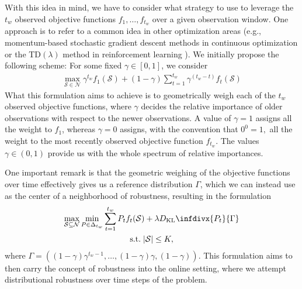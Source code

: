 \documentclass[letter,11pt]{article}
\newcommand{\infdiv}{D_{\text{KL}}\infdivx}
\def\sS{\mathcal{S}}
\def\sN{\mathcal{N}}
\begin{document}
With this idea in mind, we have to consider what strategy to use to leverage the $t_w$ observed objective functions $f_1, \ldots,f_{t_w}$ over a given observation window. One approach is to refer to a common idea in other optimization areas (e.g., momentum-based stochastic gradient descent methods in continuous optimization \cite{kingma2014adam,das2022faster} or the TD$(\lambda)$ method in reinforcement learning \cite{sutton2018reinforcement}). We initially propose the following scheme: For some fixed $\gamma \in [0, 1]$, we consider
\begin{equation}
\begin{split}
\max_{\sS \in \sN} \gamma^{t_w} f_1(\sS) + (1-\gamma) \sum_{t=1}^{t_w} \gamma^{(t_w-t)} f_t(\sS) 
\end{split}
\end{equation}
What this formulation aims to achieve is to geometrically weigh each of the $t_w$ observed objective functions, where $\gamma$ decides the relative importance of older observations with respect to the newer observations. A value of $\gamma = 1$ assigns all the weight to $f_1$, whereas $\gamma=0$ assigns, with the convention that $0^0 = 1,$ all the weight to the most recently observed objective function $f_{t_w}.$ The values $\gamma \in (0, 1)$ provide us with the whole spectrum of relative importances.

One important remark is that the geometric weighing of the objective functions over time effectively gives us a reference distribution $\Gamma$, which we can instead use as the center of a neighborhood of robustness, resulting in the formulation
\begin{equation}\label{eq:tr}
\begin{gathered}
\max_{\sS\subseteq \sN} \min_{P \in \Delta_{t_w}} \sum_{t=1}^{t_w} P_t f_t(\sS) + \lambda \infdiv{P_t}{\Gamma} \\
\text{s.t.}\;\lvert \sS \rvert \leq K, 
\end{gathered}
\end{equation}
where $\Gamma = ((1-\gamma)\gamma^{t_w-1},  \ldots, (1-\gamma)\gamma, (1-\gamma))$. This formulation aims to then carry the concept of robustness into the online setting, where we attempt distributional robustness over time steps of the problem. 
\end{document}
